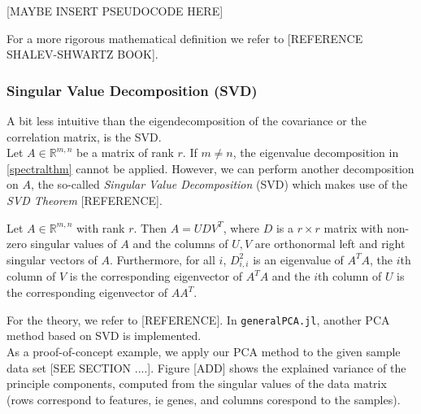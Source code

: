 [MAYBE INSERT PSEUDOCODE HERE]

For a more rigorous mathematical definition we refer to [REFERENCE SHALEV-SHWARTZ BOOK].






\hfill 
\subsubsection{Singular Value Decomposition (SVD)}\label{svd}


A bit less intuitive than the eigendecomposition of the covariance or the correlation matrix, is the SVD.\\
Let \( A \in \mathbb{R}^{m,n} \) be a matrix of rank \( r \). If \( m \neq n\), the eigenvalue decomposition in \ref{spectralthm} cannot be applied. However, we can perform another decomposition on \( A \), the so-called \textit{Singular Value Decomposition} (SVD) which makes use of the \textit{SVD Theorem} [REFERENCE].
\begin{theorem}\label{svdthm}
	Let \( A \in \mathbb{R}^{m,n} \) with rank \( r \). Then \( A = UDV^T\), where \( D \) is a \( r \times r \) matrix with non-zero singular values of \( A \) and the columns of \( U, V \) are orthonormal left and right singular vectors of \( A \). Furthermore, for all \( i \), \( D_{i,i}^{2} \) is an eigenvalue of \( A^T A\), the \( i \)th column of \( V \) is the corresponding eigenvector of \( A^T A\) and the \( i \)th column of \( U \) is the corresponding eigenvector of \( A A^T\).
\end{theorem}

% 
For the theory, we refer to [REFERENCE]. In \texttt{generalPCA.jl}, another PCA method based on SVD is implemented.\\

As a proof-of-concept example, we apply our PCA method to the given sample data set [SEE SECTION ....].
Figure [ADD] shows the explained variance of the principle components, computed from the singular values of the data matrix (rows correspond to features, ie genes, and columns corespond to the samples). 

